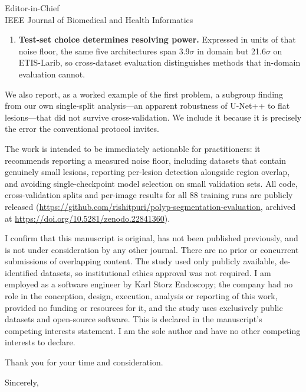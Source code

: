 \documentclass[11pt]{letter}
\begin{document}
\begin{letter}{Editor-in-Chief\\
IEEE Journal of Biomedical and Health Informatics}
\begin{enumerate}
\item \textbf{Test-set choice determines resolving power.} Expressed in units
of that noise floor, the same five architectures span 3.9$\sigma$ in domain
but 21.6$\sigma$ on ETIS-Larib, so cross-dataset evaluation distinguishes
methods that in-domain evaluation cannot.
\end{enumerate}

We also report, as a worked example of the first problem, a subgroup finding
from our own single-split analysis---an apparent robustness of U-Net++ to
flat lesions---that did not survive cross-validation. We include it because
it is precisely the error the conventional protocol invites.

The work is intended to be immediately actionable for practitioners:
it recommends reporting a measured noise floor, including datasets that
contain genuinely small lesions, reporting per-lesion detection alongside
region overlap, and avoiding single-checkpoint model selection on small
validation sets. All code, cross-validation splits and per-image results for
all 88 training runs are publicly released
(\url{https://github.com/rishitpuri/polyp-segmentation-evaluation},
archived at \url{https://doi.org/10.5281/zenodo.22841360}).

I confirm that this manuscript is original, has not been published
previously, and is not under consideration by any other journal. There are no
prior or concurrent submissions of overlapping content. The study used only
publicly available, de-identified datasets, so institutional ethics approval
was not required. I am employed as a software engineer by Karl Storz
Endoscopy; the company had no role in the conception, design, execution,
analysis or reporting of this work, provided no funding or resources for it,
and the study uses exclusively public datasets and open-source software. This
is declared in the manuscript's competing interests statement. I am the sole
author and have no other competing interests to declare.


Thank you for your time and consideration.

\closing{Sincerely,}

\end{letter}
\end{document}
